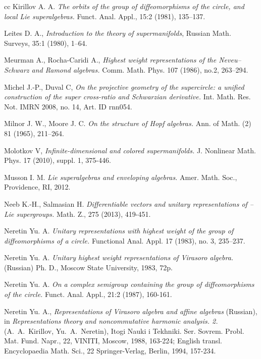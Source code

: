 \documentclass[]{amsart}
\begin{document}
\begin{thebibliography}{cc}
Kirillov A. A. {\it The orbits of the group of diffeomorphisms of the circle, and local Lie superalgebras.}
Funct. Anal. Appl., 15:2 (1981), 135--137.

 Leites D. A., {\it Introduction to the theory of supermanifolds}, Russian Math. Surveys, 35:1 (1980), 1–64.

Meurman A., Rocha-Caridi A.,
{\it Highest weight representations of the Neveu--Schwarz and Ramond algebras.} 
Comm. Math. Phys. 107 (1986), no.2, 263–294.

Michel J.-P.,  Duval C,
{\it On the projective geometry of the supercircle: a unified construction of the super cross-ratio and Schwarzian derivative.}
Int. Math. Res. Not. IMRN 2008, no. 14, Art. ID rnn054.


 Milnor J. W., Moore J. C.
{\it On the structure of Hopf algebras.}
Ann. of Math. (2) 81 (1965), 211--264.

Molotkov V,
{\it Infinite-dimensional and colored supermanifolds.}
J. Nonlinear Math. Phys. 17 (2010), suppl. 1, 375-446.


Musson I. M.
{\it Lie superalgebras and enveloping algebras.}
Amer. Math. Soc., Providence, RI, 2012. 

  
  
Neeb K.-H., Salmasian H.
{\it Differentiable vectors and unitary representations of \Frechet–Lie supergroups.} Math. Z., 275 (2013), 419-451.  
  
Neretin Yu. A.
{\it Unitary representations with highest weight of the group of diffeomorphisms of a circle.} Functional Anal. Appl. 17 (1983), no. 3, 235--237.

Neretin Yu. A.
{\it Unitary highest weight representations of Virasoro algebra.} (Russian) Ph. D.,  Moscow State University, 1983, 72p.

Neretin Yu. A.
{\it On a complex semigroup containing the group of diffeomorphisms of the circle.} %
Funct. Anal. Appl., 21:2 (1987), 160-161. 

 Neretin Yu. A., {\it Representations of Virasoro algebra and affine algebras} (Russian),  in {\it Representations theory and noncommutative harmonic analysis. 2.} (A.~A.~Kirillov, Yu.~A.~Neretin), Itogi Nauki i Tekhniki. Ser. Sovrem. Probl. Mat. Fund. Napr., 22, VINITI, Moscow, 1988, 163-224; English transl. Encyclopaedia Math. Sci., 22
Springer-Verlag, Berlin, 1994, 157-234.


\end{thebibliography}
\end{document}
